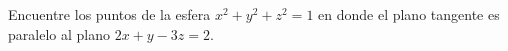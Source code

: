 \item Encuentre los puntos de la esfera $x^2 + y^2 + z^2 = 1$ en donde el plano tangente es paralelo al plano $2x + y - 3z = 2$.
